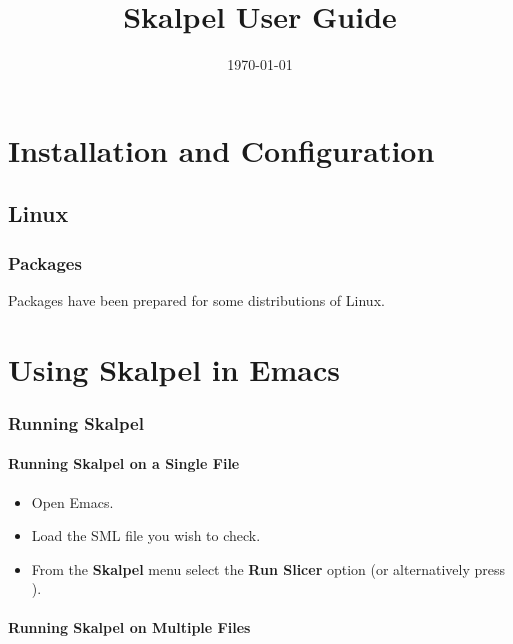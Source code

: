 \documentclass{report}
\title{Skalpel User Guide}
\date{\today}
\begin{document}
\maketitle
\vspace{110mm}
\small{
}

\newpage

\tableofcontents

\newpage

\chapter {Installation and Configuration}

\section {Linux}

\subsection {Packages}

Packages have been prepared for some distributions of Linux.

\chapter{Using Skalpel in Emacs}

\subsection{Running Skalpel}


\subsubsection{Running Skalpel on a Single File}

\begin{itemize}
\item Open Emacs.
\item Load the SML file you wish to check.
\item From the \textbf{Skalpel} menu select the \textbf{Run Slicer}
  option (or alternatively press ).
\end{itemize}

\subsubsection{Running Skalpel on Multiple Files}
\end{document}

